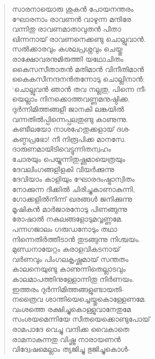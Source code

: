 \begin{verse}
സാരനായൊരു ശുകന്‍ പോയനന്തരം\\
ഘോരനാം രാവണന്‍ വാഴുന്ന മന്ദിരേ\\
വന്നിതു രാവണമാതാവുതന്‍ പിതാ\\
ഖിന്നനായ് രാവണനെക്കണ്ടു ചൊല്ലുവാന്‍.\\
സല്‍ക്കാരവും കുശലപ്രശ്നവും ചെയ്തു\\
രാക്ഷോവരനുമിരുത്തി യഥോചിതം\\
കൈസസീതാതന്‍ മതിമാന്‍ വിനീതിമാന്‍\\
കൈകസീനന്ദനന്‍തന്നോടു ചൊല്ലിനാന്‍:\\
‘ചൊല്ലുവന്‍ ഞാന്‍ തവ നല്ലതു, പിന്നെ നീ-\\
യെല്ലാം നിനക്കൊത്തവണ്ണമനുഷ്ഠിക്ക.\\
ദുര്‍ന്നിമിത്തങ്ങളീ ജാനകി ലങ്കയില്‍\\
വന്നതില്‍പ്പിന്നെപ്പലതുണ്ടു കാണുന്നു.\\
കണ്ടീലയോ നാശഹേതുക്കളായ് ദശ-\\
കണ്ഠപ്രഭോ! നീ നിരൂപിക്ക മാനസേ.\\
ദാരുണമായിടിവെട്ടുന്നിതന്വഹം\\
ചോരയും പെയ്യുന്നിതുഷ്ണമായെത്രയും\\
ദേവലിംഗങ്ങളിളകി വിയര്‍ക്കുന്നു\\
ദേവിയാം കാളിയും ഘോരദംഷ്ട്രാന്വിതം\\
നോക്കുന്ന ദിക്കില്‍ ചിരിച്ചുകാണാകുന്നി,\\
ഗോക്കളില്‍നിന്ന് ഖരങ്ങള്‍ ജനിക്കുന്നു\\
മൂഷികന്‍ മാര്‍ജാരനോടു പിണങ്ങുന്നു\\
രോഷാല്‍ നകുലങ്ങളോടുമവ്വണ്ണമേ.\\
പന്നഗജാലം ഗരുഡനോടും തഥാ\\
നിന്നെതിര്‍ത്തീടാന്‍ തുടങ്ങുന്നു നിശ്ചയം.\\
മുണ്ഡനായേറ്റം കരാളവികടനായ്\\
വര്‍ണവും പിംഗലകൃഷ്ണമായ് സന്തതം\\
കാലനെയുണ്ടു കാണുന്നിതെല്ലാടവും\\
കാലമാപത്തിനുള്ളോന്നിതു നിര്‍ണയം.\\
ഇത്തരം ദുര്‍ന്നിമിത്തങ്ങളുണ്ടായതി-\\
നത്രൈവ ശാന്തിയെച്ചെയ്തുകൊള്ളേണമേ.\\
വംശത്തെ രക്ഷിച്ചുകൊള്ളുവാനേതുമേ\\
സംശയമെന്നിയേ സീതയെക്കൊണ്ടുപോയ്\\
രാമപാദേ വെച്ചു വന്ദിക്ക വൈകാതെ\\
രാമനാകുന്നതു വിഷ്ണു നാരായണന്‍\\
വിദ്വേഷമെല്ലാം ത്യജിച്ചു ഭുജിച്ചുകൊള്‍-\\

\end{verse}
